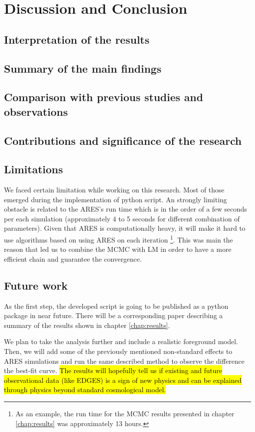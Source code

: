 \documentclass[12pt, TexShade, letterpaper]{report}
\begin{document}
\chapter{Discussion and Conclusion}
\label{chap:discussion}
\section{Interpretation of the results}
\section{Summary of the main findings}
\section{Comparison with previous studies and observations}
\section{Contributions and significance of the research}
\section{Limitations}
We faced certain limitation while working on this research. Most of those emerged during the implementation of python script. 
An strongly limiting obstacle is related to the ARES's run time which is in the order of a few seconds per each simulation (approximately 4 to 5 seconds for different combination of parameters). Given that ARES is computationally heavy, it will make it hard to use algorithms based on using ARES on each iteration \footnote{ As an example, the run time for the MCMC results presented in chapter \ref{chap:results} was approximately 13 hours.}. This was main the reason that led us to combine the MCMC with LM in order to have a more efficient chain and guarantee the convergence.\par 
\section{Future work}
As the first step, the developed script is going to be published as a python package in near future. There will be a corresponding paper describing a summary of the results shown in chapter \ref{chap:results}.\par
We plan to take the analysis further and include a realistic foreground model. Then, we will add some of the previously mentioned non-standard effects to ARES simulations and run the same described method to observe the difference the best-fit curve. \hl{The results will hopefully tell us if existing and future observational data (like EDGES) is a sign of new physics and can be explained through physics beyond standard cosmological model.}\par
\end{document}
